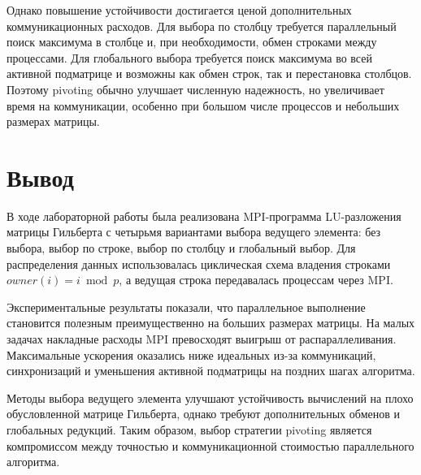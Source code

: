 \documentclass[a4paper,14pt]{extarticle}
\begin{document}
Однако повышение устойчивости достигается ценой дополнительных коммуникационных расходов. Для выбора по столбцу требуется параллельный поиск максимума в столбце и, при необходимости, обмен строками между процессами. Для глобального выбора требуется поиск максимума во всей активной подматрице и возможны как обмен строк, так и перестановка столбцов. Поэтому pivoting обычно улучшает численную надежность, но увеличивает время на коммуникации, особенно при большом числе процессов и небольших размерах матрицы.

\section{Вывод}

В ходе лабораторной работы была реализована MPI-программа LU-разложения матрицы Гильберта с четырьмя вариантами выбора ведущего элемента: без выбора, выбор по строке, выбор по столбцу и глобальный выбор. Для распределения данных использовалась циклическая схема владения строками $owner(i)=i \bmod p$, а ведущая строка передавалась процессам через MPI.

Экспериментальные результаты показали, что параллельное выполнение становится полезным преимущественно на больших размерах матрицы. На малых задачах накладные расходы MPI превосходят выигрыш от распараллеливания. Максимальные ускорения оказались ниже идеальных из-за коммуникаций, синхронизаций и уменьшения активной подматрицы на поздних шагах алгоритма.

Методы выбора ведущего элемента улучшают устойчивость вычислений на плохо обусловленной матрице Гильберта, однако требуют дополнительных обменов и глобальных редукций. Таким образом, выбор стратегии pivoting является компромиссом между точностью и коммуникационной стоимостью параллельного алгоритма.
\end{document}
